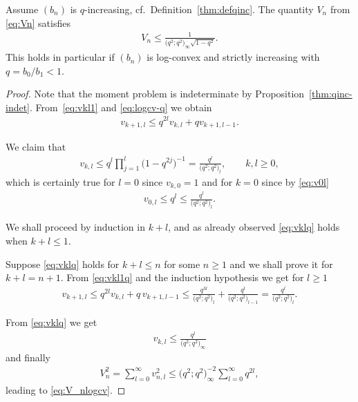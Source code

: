 \begin{thm}\label{thm:V_nlogcv} Assume $(b_n)$ is $q$-increasing, cf.\ Definition~{\rm \ref{thm:defqinc}}. The quantity $V_n$ from \eqref{eq:Vn} satisfies
\begin{gather}\label{eq:V_nlogcv}
V_n\le\frac{1}{\big(q^2;q^2\big)_\infty\sqrt{1-q^2}}.
\end{gather}
This holds in particular if $(b_n)$ is log-convex and strictly increasing with $q=b_0/b_1<1$.
\end{thm}

\begin{proof} Note that the moment problem is indeterminate by Proposition~\ref{thm:qinc-indet}. From~\eqref{eq:vkl1} and \eqref{eq:logcv-q} we obtain
\begin{gather}\label{eq:vkl1q}
v_{k+1,l}\le q^{2l} v_{k,l}+qv_{k+1,l-1}.
\end{gather}

We claim that
\begin{gather}\label{eq:vklq}
v_{k,l}\le q^l\prod_{j=1}^l \big(1-q^{2j}\big)^{-1}=\frac{q^l}{\big(q^2;q^2\big)_l},\qquad k,l\ge 0,
\end{gather}
which is certainly true for $l=0$ since $v_{k,0}=1$ and for $k=0$ since by \eqref{eq:v0l}
\begin{gather*}
v_{0,l}\le q^l\le \frac{q^l}{\big(q^2;q^2\big)_l}.
\end{gather*}

 We shall proceed by induction in $k+l$, and as already observed \eqref{eq:vklq} holds when $k+l\le 1$.

Suppose \eqref{eq:vklq} holds for $k+l\le n$ for some $n\ge 1$ and we shall prove it for $k+l=n+1$. From \eqref{eq:vkl1q} and the induction hypothesis we get for $l\ge 1$
\begin{gather*}
v_{k+1,l} \le q^{2l}v_{k,l}+q\, v_{k+1,l-1} \le \frac{q^{3l}}{\big(q^2;q^2\big)_{l}}+\frac{q^{l}}{\big(q^2;q^2\big)_{l-1}}=\frac{q^{l}}{\big(q^2;q^2\big)_{l}}.
\end{gather*}

From \eqref{eq:vklq} we get
\begin{gather*}
v_{k,l}\le \frac{q^l}{\big(q^2;q^2\big)_\infty}
\end{gather*}
and finally
\begin{gather*}
V_n^2=\sum_{l=0}^\infty v_{n,l}^2\le \big(q^2;q^2\big)_\infty^{-2}\sum_{l=0}^\infty q^{2l},
\end{gather*}
leading to \eqref{eq:V_nlogcv}.
\end{proof}

